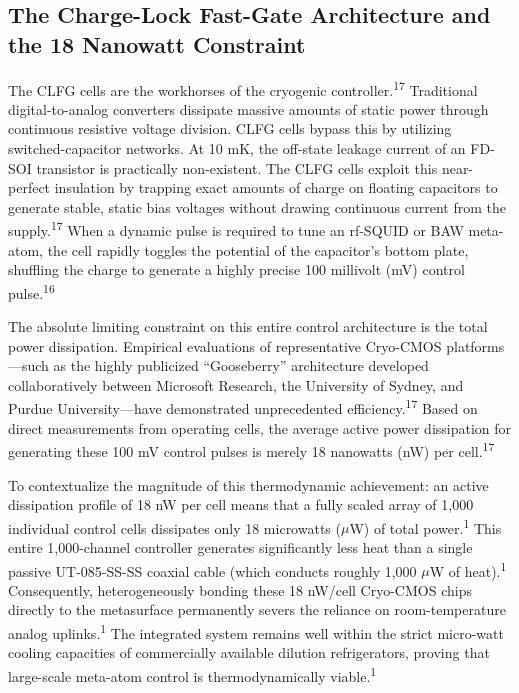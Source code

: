 \documentclass[11pt, a4paper]{article}
\begin{document}
\subsection*{The Charge-Lock Fast-Gate Architecture and the 18 Nanowatt Constraint}

The CLFG cells are the workhorses of the cryogenic controller.\textsuperscript{17} Traditional digital-to-analog converters dissipate massive amounts of static power through continuous resistive voltage division. CLFG cells bypass this by utilizing switched-capacitor networks. At 10 mK, the off-state leakage current of an FD-SOI transistor is practically non-existent. The CLFG cells exploit this near-perfect insulation by trapping exact amounts of charge on floating capacitors to generate stable, static bias voltages without drawing continuous current from the supply.\textsuperscript{17} When a dynamic pulse is required to tune an rf-SQUID or BAW meta-atom, the cell rapidly toggles the potential of the capacitor's bottom plate, shuffling the charge to generate a highly precise 100 millivolt (mV) control pulse.\textsuperscript{16}

The absolute limiting constraint on this entire control architecture is the total power dissipation. Empirical evaluations of representative Cryo-CMOS platforms---such as the highly publicized ``Gooseberry'' architecture developed collaboratively between Microsoft Research, the University of Sydney, and Purdue University---have demonstrated unprecedented efficiency.\textsuperscript{17} Based on direct measurements from operating cells, the average active power dissipation for generating these 100 mV control pulses is merely 18 nanowatts (nW) per cell.\textsuperscript{17}

To contextualize the magnitude of this thermodynamic achievement: an active dissipation profile of 18 nW per cell means that a fully scaled array of 1,000 individual control cells dissipates only 18 microwatts ($\mu$W) of total power.\textsuperscript{1} This entire 1,000-channel controller generates significantly less heat than a single passive UT-085-SS-SS coaxial cable (which conducts roughly 1,000 $\mu$W of heat).\textsuperscript{1} Consequently, heterogeneously bonding these 18 nW/cell Cryo-CMOS chips directly to the metasurface permanently severs the reliance on room-temperature analog uplinks.\textsuperscript{1} The integrated system remains well within the strict micro-watt cooling capacities of commercially available dilution refrigerators, proving that large-scale meta-atom control is thermodynamically viable.\textsuperscript{1}
\end{document}
